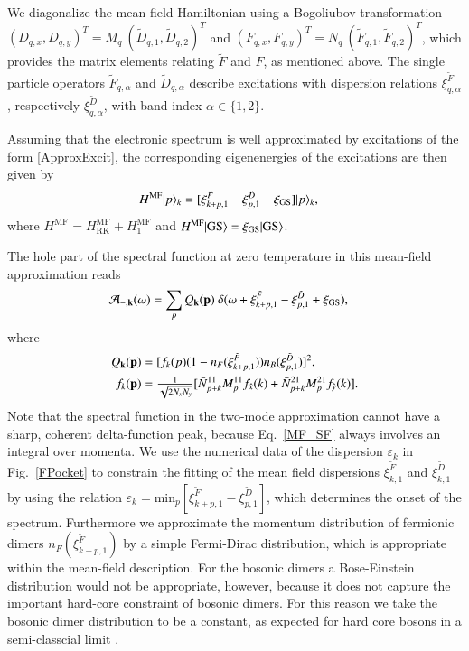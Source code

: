 \documentclass[aps,pra,reprint,showpacs,superscriptaddress]{revtex4-1}
\DeclarePairedDelimiter\ket{\lvert}{\rangle}
\newcommand{\ann}[2]{{#1}^{\phantom{\dagger}}_{#2}}
\begin{document}
We diagonalize the mean-field Hamiltonian using a Bogoliubov transformation $(\ann{D}{q,x},\ann{D}{q,y})^T=M_q\ (\ann{\tilde{D}}{q,1},\ann{\tilde{D}}{q,2})^T$  and $(\ann{F}{q,x},\ann{F}{q,y})^T =  N_q\ (\ann{\tilde{F}}{q,1},\ann{\tilde{F}}{q,2})^T$, which provides the matrix elements relating $\tilde{F}$ and $F$, as mentioned above. The single particle operators $\ann{\tilde{F}}{q,\alpha}$ and $\ann{\tilde{D}}{q,\alpha}$ describe excitations with dispersion relations $\xi^{\tilde{F}}_{q,\alpha}$, respectively $\xi^{\tilde{D}}_{q,\alpha}$, with band index $\alpha \in \{ 1,2 \}$.

Assuming that the electronic spectrum is well approximated by excitations of the form \eqref{ApproxExcit}, the corresponding eigenenergies of the excitations are then given by
\begin{align}
H^{\text{MF}}\ket{p}_k&=[\xi^{\tilde{F}}_{k+p,1}-\xi^{\tilde{D}}_{p,1}+\xi_{\text{GS}}]\ket{p}_k,\nonumber
\end{align}
where $H^{\text{MF}}=H^{\text{MF}}_{\text{RK}}+H^{\text{MF}}_{1}$ and $H^{\text{MF}}\ket{\text{GS}}=\xi_{\text{GS}}\ket{\text{GS}}$.


The hole part of the spectral function at zero temperature in this mean-field approximation reads
\begin{align}
\mathcal{A}_{-,\bold{k}}(\omega) &=\sum_{p} Q_{\bold{k}}(\bold{p})\ \delta(\omega + \xi^{\tilde{F}}_{k+p,1} - \xi^{\tilde{D}}_{p,1}+\xi_{\text{GS}}),  \label{MF_SF}
\end{align}
where 
\begin{align}
Q_{\bold{k}}(\bold{p})&=[f_k(p) (1-n_{F}(\xi^{\tilde{F}}_{k+p,1}))n_{B}(\xi^{\tilde{D}}_{p,1})]^2,\nonumber\\
f_{k}(\bold{p})&=\tfrac{1}{\sqrt{2N_xN_y}}[\bar{N}^{11}_{p+k} M^{11}_p f_{\hat{x}}(k) + \bar{N}^{21}_{p+k} M^{21}_p f_{\hat{y}}(k)].\nonumber
\end{align}
Note that the spectral function in the two-mode approximation cannot have a sharp, coherent delta-function peak, because Eq.~\eqref{MF_SF} always involves an integral over momenta. 
We use the numerical data of the dispersion $\varepsilon_k$ in Fig.~\ref{FPocket} to constrain the fitting of the mean field dispersions $\xi^{\tilde{F}}_{k,1}$ and $\xi^{\tilde{D}}_{k,1}$ by using the relation $\varepsilon_{k}=\text{min}_p [\xi^{\tilde{F}}_{k+p,1} - \xi^{\tilde{D}}_{p,1}]$, which determines the onset of the spectrum. 
Furthermore we approximate the momentum distribution of fermionic dimers $n_{F}(\xi^{\tilde{F}}_{k+p,1})$ by a simple Fermi-Dirac distribution, which is appropriate within the mean-field description. For the bosonic dimers a Bose-Einstein distribution would not be appropriate, however, because it does not capture the important hard-core constraint of bosonic dimers. For this reason we take the bosonic dimer distribution to be a constant, as expected for hard core bosons in a semi-classcial limit \cite{coletta2012semiclassical}.
\end{document}
